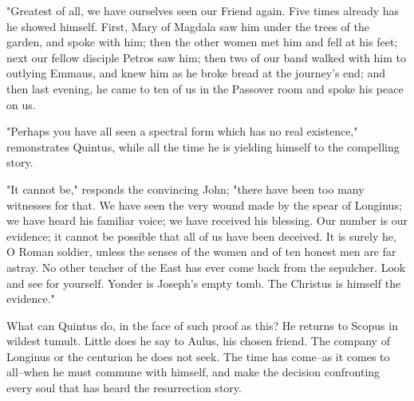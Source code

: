 "Greatest of all, we have ourselves seen our Friend again.  Five
times already has he showed himself.  First, Mary of Magdala saw
him under the trees of the garden, and spoke with him; then the
other women met him and fell at his feet; next our fellow disciple
Petros saw him; then two of our band walked with him to outlying
Emmaus, and knew him as he broke bread at the journey's end; and
then last evening, he came to ten of us in the Passover room and
spoke his peace on us.

"Perhaps you have all seen a spectral form which has no real
existence," remonstrates Quintus, while all the time he is yielding
himself to the compelling story.

"It cannot be," responds the convincing John; "there have been too
many witnesses for that.  We have seen the very wound made by the
spear of Longinus; we have heard his familiar voice; we have
received his blessing.  Our number is our evidence; it cannot be
possible that all of us have been deceived.  It is surely he, O
Roman soldier, unless the senses of the women and of ten honest men
are far astray.  No other teacher of the East has ever come back
from the sepulcher.  Look and see for yourself.  Yonder is Joseph's
empty tomb.  The Christus is himself the evidence."


What can Quintus do, in the face of such proof as this?  He returns
to Scopus in wildest tumult.  Little does he say to Aulus, his
chosen friend.  The company of Longinus or the centurion he does
not seek.  The time has come--as it comes to all--when he must
commune with himself, and make the decision confronting every soul
that has heard the resurrection story.